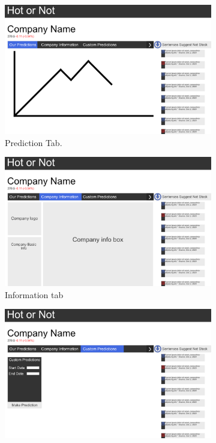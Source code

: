         \begin{figure}[!h]
            \begin{subfigure}[b]{0.3\textwidth}
                \includegraphics[width=\textwidth]{images/upload/Company-wireframe 4.png}
                \caption{Prediction Tab.}
                \label{fig:company_tab1}
            \end{subfigure}
            \hfill
            \begin{subfigure}[b]{0.3\textwidth}
                \includegraphics[width=\textwidth]{images/upload/Comapny-wireframe 6.png}
                \caption{Information tab}
                \label{fig:company_tab2}
            \end{subfigure}
            \hfill
            \begin{subfigure}[b]{0.3\textwidth}
                \includegraphics[width=\textwidth]{images/upload/Company-wireframe 5.png}

\end{subfigure}
\end{figure}
